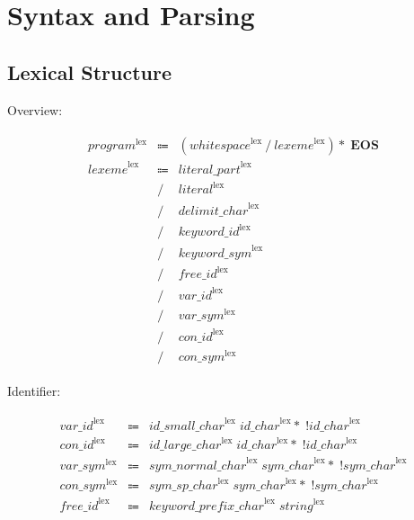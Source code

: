 \chapter{Syntax and Parsing}

\section{Lexical Structure}

Overview:

\begin{align*}
    \begin{array}{rcll}
        \mathit{program}^\mathrm{lex}
        &\Coloneq &(\mathit{whitespace}^\mathrm{lex} \mathrel{/} \mathit{lexeme}^\mathrm{lex}){*}\; \mathbf{EOS} \\
        \mathit{lexeme}^\mathrm{lex}
        &\Coloneq &\mathit{literal\_part}^\mathrm{lex} \\
        &\mathrel{/} &\mathit{literal}^\mathrm{lex} \\
        &\mathrel{/} &\mathit{delimit\_char}^\mathrm{lex} \\
        &\mathrel{/} &\mathit{keyword\_id}^\mathrm{lex} \\
        &\mathrel{/} &\mathit{keyword\_sym}^\mathrm{lex} \\
        &\mathrel{/} &\mathit{free\_id}^\mathrm{lex} \\
        &\mathrel{/} &\mathit{var\_id}^\mathrm{lex} \\
        &\mathrel{/} &\mathit{var\_sym}^\mathrm{lex} \\
        &\mathrel{/} &\mathit{con\_id}^\mathrm{lex} \\
        &\mathrel{/} &\mathit{con\_sym}^\mathrm{lex}
    \end{array}
\end{align*}

Identifier:

\begin{align*}
    \begin{array}{rcll}
        \mathit{var\_id}^\mathrm{lex}
        &\Coloneq &\mathit{id\_small\_char}^\mathrm{lex}\; \mathit{id\_char}^\mathrm{lex}{*}\; \mathop{!} \mathit{id\_char}^\mathrm{lex} \\
        \mathit{con\_id}^\mathrm{lex}
        &\Coloneq &\mathit{id\_large\_char}^\mathrm{lex}\; \mathit{id\_char}^\mathrm{lex}{*}\; \mathop{!} \mathit{id\_char}^\mathrm{lex} \\
        \mathit{var\_sym}^\mathrm{lex}
        &\Coloneq &\mathit{sym\_normal\_char}^\mathrm{lex}\; \mathit{sym\_char}^\mathrm{lex}{*}\; \mathop{!} \mathit{sym\_char}^\mathrm{lex} \\
        \mathit{con\_sym}^\mathrm{lex}
        &\Coloneq &\mathit{sym\_sp\_char}^\mathrm{lex}\; \mathit{sym\_char}^\mathrm{lex}{*}\; \mathop{!} \mathit{sym\_char}^\mathrm{lex} \\
        \mathit{free\_id}^\mathrm{lex}
        &\Coloneq &\mathit{keyword\_prefix\_char}^\mathrm{lex}\; \mathit{string}^\mathrm{lex}
    \end{array}
\end{align*}

